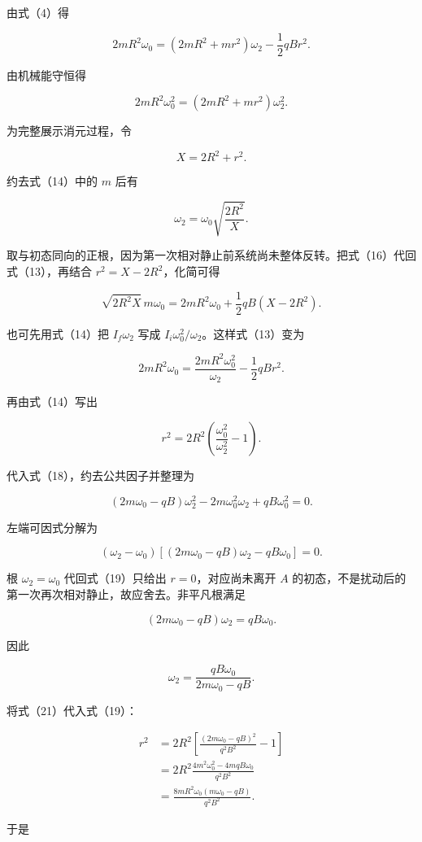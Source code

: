 \documentclass[12pt,a4paper,UTF8]{ctexart}
\begin{document}
由式（4）得

\[
2mR^2\omega_0
=(2mR^2+mr^2)\omega_2-\frac12qBr^2. \tag{13}
\]

由机械能守恒得

\[
2mR^2\omega_0^2
=(2mR^2+mr^2)\omega_2^2. \tag{14}
\]

为完整展示消元过程，令

\[
X=2R^2+r^2. \tag{15}
\]

约去式（14）中的 \(m\) 后有

\[
\omega_2=\omega_0\sqrt{\frac{2R^2}{X}}. \tag{16}
\]

取与初态同向的正根，因为第一次相对静止前系统尚未整体反转。把式（16）代回式（13），再结合
\(r^2=X-2R^2\)，化简可得

\[
\sqrt{2R^2X}\,m\omega_0
=2mR^2\omega_0+\frac12qB(X-2R^2). \tag{17}
\]

也可先用式（14）把 \(I_f\omega_2\) 写成
\(I_i\omega_0^2/\omega_2\)。这样式（13）变为

\[
2mR^2\omega_0
=\frac{2mR^2\omega_0^2}{\omega_2}
-\frac12qBr^2. \tag{18}
\]

再由式（14）写出

\[
r^2=2R^2\left(\frac{\omega_0^2}{\omega_2^2}-1\right). \tag{19}
\]

代入式（18），约去公共因子并整理为

\[
(2m\omega_0-qB)\omega_2^2
-2m\omega_0^2\omega_2+qB\omega_0^2=0. \tag{20}
\]

左端可因式分解为

\[
(\omega_2-\omega_0)
\left[(2m\omega_0-qB)\omega_2-qB\omega_0\right]=0. \tag{20a}
\]

根 \(\omega_2=\omega_0\) 代回式（19）只给出 \(r=0\)，对应尚未离开 \(A\)
的初态，不是扰动后的第一次再次相对静止，故应舍去。非平凡根满足

\[
(2m\omega_0-qB)\omega_2=qB\omega_0. \tag{20b}
\]

因此

\[
\boxed{\omega_2=\frac{qB\omega_0}{2m\omega_0-qB}}. \tag{21}
\]

将式（21）代入式（19）：

\[
\begin{aligned}
r^2
&=2R^2\left[\frac{(2m\omega_0-qB)^2}{q^2B^2}-1\right]\\
&=2R^2\frac{4m^2\omega_0^2-4mqB\omega_0}{q^2B^2}\\
&=\frac{8mR^2\omega_0(m\omega_0-qB)}{q^2B^2}. 
\end{aligned}
\tag{22}
\]

于是
\end{document}
